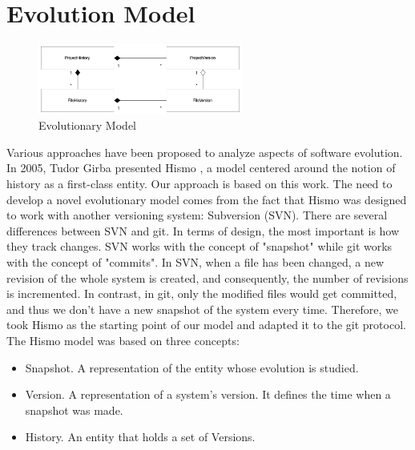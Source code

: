 \newpage
\section{Evolution Model}
\label{s:EvolutionModel}

\begin{figure}[H]
    \begin{center}
        \includegraphics[width=0.6\textwidth]{EvolutionModel.jpg}
    \end{center}
    \caption{Evolutionary Model}
    \label{fig:EvolutionaryModel}
\end{figure}
Various approaches have been proposed to analyze aspects of software evolution. In 2005, Tudor Girba presented Hismo \cite{Girba2005}, a model centered around the notion of history as a first-class entity. Our approach is based on this work. The need to develop a novel evolutionary model comes from the fact that Hismo was designed to work with another versioning system: Subversion (SVN). 
There are several differences between SVN and git. In terms of design, the most important is how they track changes. 
SVN works with the concept of "snapshot" while git works with the concept of "commits". In SVN, when a file has been changed, a new revision of the whole system is created, and consequently, the number of revisions is incremented. 
In contrast, in git, only the modified files would get committed, and thus we don't have a new snapshot of the system every time. 
Therefore, we took Hismo as the starting point of our model and adapted it to the git protocol. 
The Hismo model was based on three concepts:
\begin{itemize}
    \item Snapshot. A representation of the entity whose evolution is studied.
    \item Version. A representation of a system's version. It defines the time when a snapshot was made. 
    \item History. An entity that holds a set of Versions.
\end{itemize}

